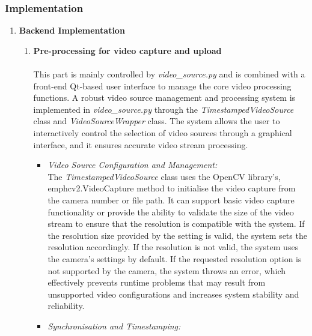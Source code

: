 \documentclass[12pt]{article}
\begin{document}
\subsubsection{Implementation}
\begin{enumerate}

      \item \textbf{Backend Implementation}
            \begin{enumerate}
                  \item \textbf{Pre-processing for video capture and upload}
                        \\\\
                        This part is mainly controlled by \emph{video\_source.py} and is combined with a front-end Qt-based user interface to manage the core video processing functions. A robust video source management and processing system is implemented in \emph{video\_source.py} through the \emph{TimestampedVideoSource} class and \emph{VideoSourceWrapper} class. The system allows the user to interactively control the selection of video sources through a graphical interface, and it ensures accurate video stream processing.
                        \begin{itemize}
                              \item \textit{Video Source Configuration and Management:}
                                    \\
                                    The \emph{TimestampedVideoSource} class uses the OpenCV library's, emph{cv2.VideoCapture} method to initialise the video capture from the camera number or file path. It can support basic video capture functionality or provide the ability to validate the size of the video stream to ensure that the resolution is compatible with the system. If the resolution size provided by the setting is valid, the system sets the resolution accordingly. If the resolution is not valid, the system uses the camera's settings by default. If the requested resolution option is not supported by the camera, the system throws an error, which effectively prevents runtime problems that may result from unsupported video configurations and increases system stability and reliability.
                              \item \textit{Synchronisation and Timestamping:}
                                    \\

\end{itemize}
\end{enumerate}
\end{enumerate}
\end{document}
